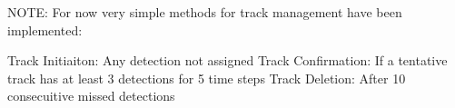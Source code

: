 NOTE: For now very simple methods for track management have been implemented:

Track Initiaiton: Any detection not assigned
Track Confirmation: If a tentative track has at least 3 detections for 5 time steps
Track Deletion: After 10 consecuitive missed detections